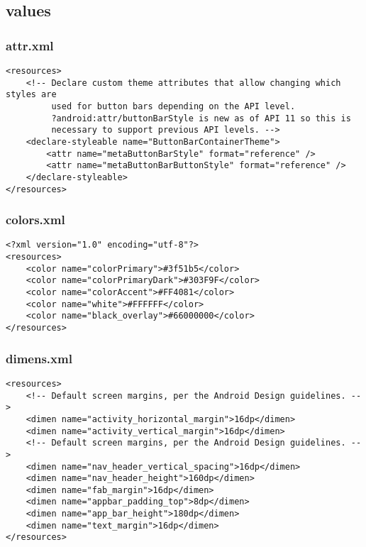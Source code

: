 \subsection*{values}
\subsubsection*{attr.xml}
\begin{lstlisting}
<resources>
    <!-- Declare custom theme attributes that allow changing which styles are
         used for button bars depending on the API level.
         ?android:attr/buttonBarStyle is new as of API 11 so this is
         necessary to support previous API levels. -->
    <declare-styleable name="ButtonBarContainerTheme">
        <attr name="metaButtonBarStyle" format="reference" />
        <attr name="metaButtonBarButtonStyle" format="reference" />
    </declare-styleable>
</resources>
\end{lstlisting}

\subsubsection*{colors.xml}
\begin{lstlisting}
<?xml version="1.0" encoding="utf-8"?>
<resources>
    <color name="colorPrimary">#3f51b5</color>
    <color name="colorPrimaryDark">#303F9F</color>
    <color name="colorAccent">#FF4081</color>
    <color name="white">#FFFFFF</color>
    <color name="black_overlay">#66000000</color>
</resources>
\end{lstlisting}

\subsubsection*{dimens.xml}
\begin{lstlisting}
<resources>
    <!-- Default screen margins, per the Android Design guidelines. -->
    <dimen name="activity_horizontal_margin">16dp</dimen>
    <dimen name="activity_vertical_margin">16dp</dimen>
    <!-- Default screen margins, per the Android Design guidelines. -->
    <dimen name="nav_header_vertical_spacing">16dp</dimen>
    <dimen name="nav_header_height">160dp</dimen>
    <dimen name="fab_margin">16dp</dimen>
    <dimen name="appbar_padding_top">8dp</dimen>
    <dimen name="app_bar_height">180dp</dimen>
    <dimen name="text_margin">16dp</dimen>
</resources>
\end{lstlisting}

